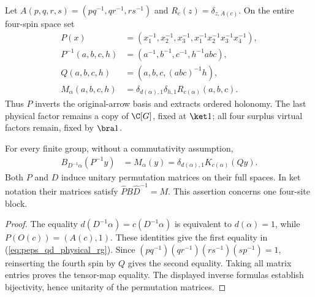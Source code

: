 \begin{definition}
    \label{def:peps_qd_physical_renorm}
    \leanok
    Let $A(p,q,r,s)=(pq^{-1},qr^{-1},rs^{-1})$ and
    $R_c(z)=\delta_{z,A(c)}$. On the entire four-spin space set
    \begin{align}
        P(x)              & =(x_1^{-1},x_2^{-1},x_3^{-1},x_1^{-1}x_2^{-1}x_3^{-1}x_4^{-1}), \\
        P^{-1}(a,b,c,h)   & =(a^{-1},b^{-1},c^{-1},h^{-1}abc),                              \\
        Q(a,b,c,h)        & =(a,b,c,(abc)^{-1}h),                                           \\
        M_\alpha(a,b,c,h) & =\delta_{d(\alpha),1}\delta_{h,1}R_{c(\alpha)}(a,b,c).
        \label{eq:peps_qd_physical_renorm}
    \end{align}
    Thus $P$ inverts the original-arrow basis and extracts ordered holonomy.
    The last physical factor remains a copy of $\C[G]$, fixed at $\ket1$;
    all four surplus virtual factors remain, fixed by $\bra1$.
\end{definition}

\begin{lemma}
    \label{thm:peps_qd_physical_renorm}
    \leanok
    For every finite group, without a commutativity assumption,
    \begin{align}
        B_{D^{-1}\alpha}(P^{-1}y) & =M_\alpha(y)
        =\delta_{d(\alpha),1}K_{c(\alpha)}(Qy).
        \label{eq:peps_qd_physical_rg}
    \end{align}
    Both $P$ and $D$ induce unitary permutation matrices on their full
    spaces. In ket notation their matrices satisfy
    $\widehat P B\widehat D^{-1}=M$.
    This assertion concerns one four-site block.
\end{lemma}
\begin{proof}\leanok
    The equality $d(D^{-1}\alpha)=c(D^{-1}\alpha)$ is equivalent to
    $d(\alpha)=1$, while $P(O(c))=(A(c),1)$.
    These identities give the first equality in (\ref{eq:peps_qd_physical_rg}).
    Since $(pq^{-1})(qr^{-1})(rs^{-1})(sp^{-1})=1$, reinserting the
    fourth spin by $Q$ gives the second equality. Taking all matrix entries
    proves the tensor-map equality. The displayed inverse formulas establish
    bijectivity, hence unitarity of the permutation matrices.
\end{proof}

